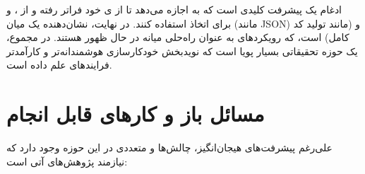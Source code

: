ادغام  یک پیشرفت کلیدی است که به  اجازه می‌دهد تا از ی خود فراتر رفته و از ،  و  برای اتخاذ  استفاده کنند. در نهایت،  نشان‌دهنده یک  میان  (مانند JSON) و  (مانند تولید کد کامل) است، که رویکردهای  به عنوان راه‌حلی میانه در حال ظهور هستند. در مجموع،  یک حوزه تحقیقاتی بسیار پویا است که نویدبخش خودکارسازی هوشمندانه‌تر و کارآمدتر فرایندهای علم داده است.

\section{مسائل باز و کارهای قابل انجام}
علی‌رغم پیشرفت‌های هیجان‌انگیز، چالش‌ها و  متعددی در این حوزه وجود دارد که نیازمند پژوهش‌های آتی است:


